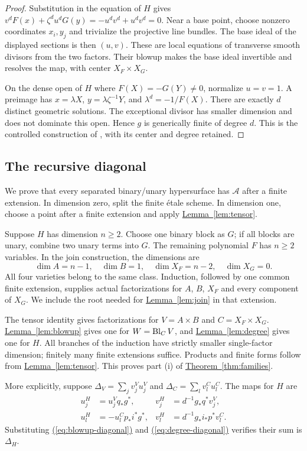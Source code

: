 \documentclass[11pt,a4paper]{article}
\theoremstyle{definition}
\theoremstyle{remark}\newtheorem{remark}[theorem]{Remark}
\numberwithin{equation}{section}
\newcommand{\thmref}[1]{\hyperref[#1]{\textcolor{resultlink}{Theorem~\ref*{#1}}}}
\newcommand{\lemref}[1]{\hyperref[#1]{\textcolor{resultlink}{Lemma~\ref*{#1}}}}
\renewcommand{\eqref}[1]{\hyperref[#1]{\textcolor{equationlink}{(\ref*{#1})}}}
\begin{document}
\begin{proof}
Substitution in the equation of $H$ gives
$v^dF(x)+\zeta^du^dG(y)=-u^dv^d+u^dv^d=0$.
Near a base point, choose nonzero coordinates $x_i,y_j$ and
trivialize the projective line bundles. The base ideal of the
displayed sections is then $(u,v)$. These are local equations
of transverse smooth divisors from the two factors. Their blowup
makes the base ideal invertible and resolves the map, with center
$X_F\times X_G$.

On the dense open of $H$ where $F(X)=-G(Y)\ne0$, normalize
$u=v=1$. A preimage has
$x=\lambda X$, $y=\lambda\zeta^{-1}Y$, and
$\lambda^d=-1/F(X)$. There are exactly $d$ distinct geometric
solutions. The exceptional divisor has smaller dimension and
does not dominate this open. Hence $g$ is generically finite
of degree $d$. This is the controlled construction of
\cite[Remark 1.10]{SK}, with its center and degree retained.
\end{proof}

\subsection{The recursive diagonal}\label{proof:binary}

We prove that every separated binary/unary hypersurface has
$\mathcal A$ after a finite extension. In dimension zero, split
the finite \'etale scheme. In dimension one, choose a
point after a finite extension and apply \lemref{lem:tensor}.

Suppose $H$ has dimension $n\ge2$. Choose one binary block as
$G$; if all blocks are unary, combine two unary terms into $G$.
The remaining polynomial $F$ has $n\ge2$ variables. In the
join construction, the dimensions are
\[
 \dim A=n-1,\quad \dim B=1,\quad
 \dim X_F=n-2,\quad \dim X_G=0.
\]
All four varieties belong to the same class. Induction, followed
by one common finite extension, supplies actual factorizations
for $A$, $B$, $X_F$ and every component of $X_G$. We include
the root needed for \lemref{lem:join} in that extension.

The tensor identity gives factorizations for $V=A\times B$ and
$C=X_F\times X_G$. \lemref{lem:blowup} gives one for $W=\operatorname{Bl}_CV$,
and \lemref{lem:degree} gives one for $H$. All branches of the
induction have strictly smaller single-factor dimension; finitely
many finite extensions suffice. Products and finite forms follow
from \lemref{lem:tensor}. This proves part (i) of
\thmref{thm:families}.

More explicitly, suppose
$\Delta_V=\sum_jv_j^Vu_j^V$ and $\Delta_C=\sum_l v_l^Cu_l^C$.
The maps for $H$ are
\begin{align}
 u_j^H&=u_j^Vq_*g^*,& v_j^H&=d^{-1}g_*q^*v_j^V,\label{eq:ambient-recursion}\\
 u_l^H&=-u_l^Cp_*i^*g^*,& v_l^H&=d^{-1}g_*i_*p^*v_l^C.
 \label{eq:center-recursion}
\end{align}
Substituting \eqref{eq:blowup-diagonal} and
\eqref{eq:degree-diagonal} verifies their sum is $\Delta_H$.
\end{document}
